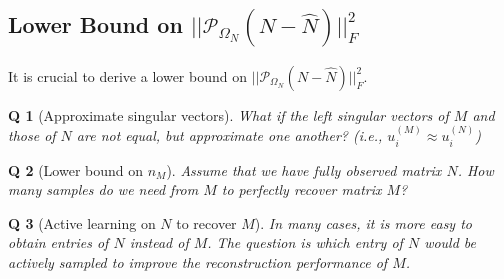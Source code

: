 \documentclass{article} %
\newtheorem{question}{Q}
\newcommand\mc{\mathcal} %
\begin{document}
\subsection{Lower Bound on $||\mc{P}_{\Omega_N}(N-\hat{N})||_F^2$}

It is crucial to derive a lower bound on $||\mc{P}_{\Omega_N}(N-\hat{N})||_F^2$.

\begin{question}[Approximate singular vectors]
What if the left singular vectors of $M$ and those of $N$ are not equal, but approximate one another? (i.e., $u_i^{(M)} \approx u_i^{(N)}$)
\end{question}

\begin{question}[Lower bound on $n_M$]
Assume that we have fully observed matrix $N$. How many samples do we need from $M$ to perfectly recover matrix $M$?
\end{question}

\begin{question}[Active learning on $N$ to recover $M$]
In many cases, it is more easy to obtain entries of $N$ instead of $M$. The question is which entry of $N$ would be actively sampled to improve the reconstruction performance of $M$.
\end{question}





\end{document}
